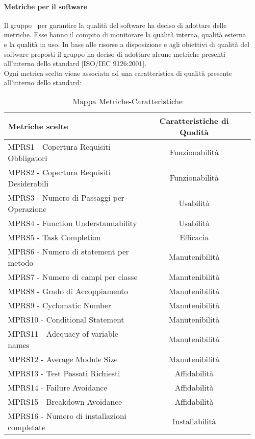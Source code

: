 \documentclass[../PianoDiQualifica.tex]{subfiles}
\begin{document}
			\paragraph{Metriche per il software}
			Il gruppo \leaf\ per garantire la qualità del software ha deciso di adottare delle metriche. Esse hanno il compito di monitorare la qualità interna, qualità esterna e la qualità in uso. In base alle risorse a disposizione e agli obiettivi di qualità del software preposti il gruppo ha deciso di adottare alcune metriche presenti all'interno dello standard [ISO/IEC 9126:2001].\\
			Ogni metrica scelta viene associata ad una caratteristica di qualità presente all'interno dello standard:
			\begin{table}[H]
				\centering
				\begin{tabular}{l * {2}{c}}
					\toprule
					\textbf{Metriche scelte} & \textbf{Caratteristiche di Qualità} \\
					\midrule
					MPRS1 - Copertura Requisiti Obbligatori & Funzionabilità \\
					MPRS2 - Copertura Requisiti Desiderabili &Funzionabilità\\
					MPRS3 - Numero di Passaggi per Operazione & Usabilità\\
					MPRS4 - Function Understandability & Usabilità\\
					MPRS5 - Task Completion & Efficacia \\
					MPRS6 - Numero di statement per metodo & Manutenibilità\\
					MPRS7 - Numero di campi per classe & Manutenibilità\\
					MPRS8 - Grado di Accoppiamento & Manutenibilità\\
					MPRS9 - Cyclomatic Number & Manutenibilità\\
					MPRS10 - Conditional Statement & Manutenibilità\\
					MPRS11 - Adequacy of variable names & Manutenibilità\\
					MPRS12 - Average Module Size & Manutenibilità\\
					MPRS13 - Test Passati Richiesti & Affidabilità\\
					MPRS14 - Failure Avoidance & Affidabilità\\
					MPRS15 - Breakdown Avoidance & Affidabilità\\
					MPRS16 - Numero di installazioni completate & Installabilità\\
					\midrule
				\end{tabular}
				\caption{Mappa Metriche-Caratteristiche}
				\label{tab:mappa_metriche_caratteristice}
			\end{table}
\end{document}
